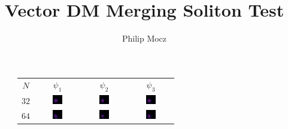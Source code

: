 \documentclass{article}
\title{Vector DM Merging Soliton Test}
\author{Philip Mocz}
\begin{document}
\maketitle

\begin{figure}[ht]
\begin{tabular}{cccc}
$N$ & $\psi_1$ & $\psi_2$ & $\psi_3$ \\
$32$ & 
\includegraphics[width=0.24\textwidth]{s42r32s20psi1.png} &
\includegraphics[width=0.24\textwidth]{s42r32s20psi2.png} &
\includegraphics[width=0.24\textwidth]{s42r32s20psi3.png} \\
$64$ & 
\includegraphics[width=0.24\textwidth]{s42r64s20psi1.png} &
\includegraphics[width=0.24\textwidth]{s42r64s20psi2.png} &
\includegraphics[width=0.24\textwidth]{s42r64s20psi3.png} \\

\end{tabular}
\end{figure}
\end{document}
